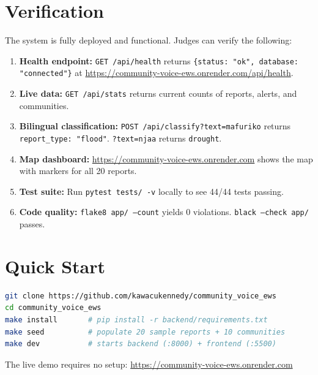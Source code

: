 \documentclass[11pt,a4paper]{article}
\begin{document}
\section{Verification}

The system is fully deployed and functional. Judges can verify the following:

\begin{enumerate}[leftmargin=1.2em]
  \item \textbf{Health endpoint:} \texttt{GET /api/health} returns \texttt{\{status: "ok", database: "connected"\}} at \url{https://community-voice-ews.onrender.com/api/health}.
  \item \textbf{Live data:} \texttt{GET /api/stats} returns current counts of reports, alerts, and communities.
  \item \textbf{Bilingual classification:} \texttt{POST /api/classify?text=mafuriko} returns \texttt{report\_type: "flood"}. \texttt{?text=njaa} returns \texttt{drought}.
  \item \textbf{Map dashboard:} \url{https://community-voice-ews.onrender.com} shows the map with markers for all 20 reports.
  \item \textbf{Test suite:} Run \texttt{pytest tests/ -v} locally to see 44/44 tests passing.
  \item \textbf{Code quality:} \texttt{flake8 app/ --count} yields 0 violations. \texttt{black --check app/} passes.
\end{enumerate}

\section{Quick Start}

\begin{lstlisting}[language=bash, caption=Run locally in under 2 minutes]
git clone https://github.com/kawacukennedy/community_voice_ews
cd community_voice_ews
make install       # pip install -r backend/requirements.txt
make seed          # populate 20 sample reports + 10 communities
make dev           # starts backend (:8000) + frontend (:5500)
\end{lstlisting}

The live demo requires no setup: \url{https://community-voice-ews.onrender.com}

\end{document}
